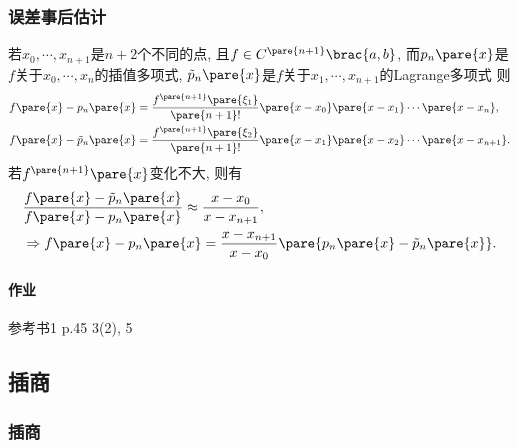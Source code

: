 \documentclass[hidelinks]{ctexart}
\begin{document}

\subsubsection{误差事后估计} %
\label{ssub:误差事后估计}

若$x_0,\cdots, x_{n+1}$是$n+2$个不同的点, 且$f\in C^{\pare{n+1}}\brac{a,b}$, 而$p_n\pare{x}$是$f$关于$x_0,\cdots,x_{n}$的插值多项式, $\tilde{p}_n\pare{x}$是$f$关于$x_1,\cdots,x_{n+1}$的Lagrange多项式 则
\begin{align*}
    & f\pare{x} - p_n\pare{x} = \frac{f^{\pare{n+1}}\pare{\xi_1}}{\pare{n+1}!}\pare{x-x_0}\pare{x-x_1}\cdots \pare{x-x_n}, \\
    & f\pare{x} - \tilde{p}_n\pare{x} = \frac{f^{\pare{n+1}}\pare{\xi_2}}{\pare{n+1}!}\pare{x-x_1}\pare{x-x_2}\cdots \pare{x-x_{n+1}}.
\end{align*}
若$f^{\pare{n+1}}\pare{x}$变化不大, 则有
\begin{align*}
    & \frac{f\pare{x} - \tilde{p}_n\pare{x}}{f\pare{x} - p_n\pare{x}} \approx \frac{x-x_0}{x-x_{n+1}}, \\
    & \Rightarrow f\pare{x} - p_n\pare{x} = \frac{x-x_{n+1}}{x-x_0}\pare{p_n\pare{x} - \tilde{p}_n\pare{x}}.
\end{align*}

\paragraph{作业} %
\label{par:作业}

参考书1 p.45 3(2), 5




\subsection{插商} %
\label{sub:插商}

\subsubsection{插商} %
\label{ssub:插商}
\end{document}
